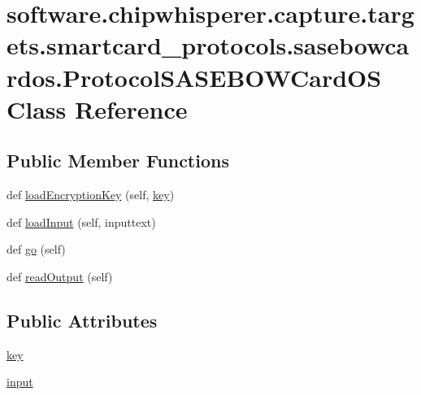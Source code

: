 \hypertarget{classsoftware_1_1chipwhisperer_1_1capture_1_1targets_1_1smartcard__protocols_1_1sasebowcardos_1_1ProtocolSASEBOWCardOS}{}\section{software.\+chipwhisperer.\+capture.\+targets.\+smartcard\+\_\+protocols.\+sasebowcardos.\+Protocol\+S\+A\+S\+E\+B\+O\+W\+Card\+O\+S Class Reference}
\label{classsoftware_1_1chipwhisperer_1_1capture_1_1targets_1_1smartcard__protocols_1_1sasebowcardos_1_1ProtocolSASEBOWCardOS}
\subsection*{Public Member Functions}
\begin{DoxyCompactItemize}
\item 
def \hyperlink{classsoftware_1_1chipwhisperer_1_1capture_1_1targets_1_1smartcard__protocols_1_1sasebowcardos_1_1ProtocolSASEBOWCardOS_a684817de795ab9621c3a09b377d84087}{load\+Encryption\+Key} (self, \hyperlink{classsoftware_1_1chipwhisperer_1_1capture_1_1targets_1_1smartcard__protocols_1_1sasebowcardos_1_1ProtocolSASEBOWCardOS_aeaa46d1304eb946ffc58d20c75c0031f}{key})
\item 
def \hyperlink{classsoftware_1_1chipwhisperer_1_1capture_1_1targets_1_1smartcard__protocols_1_1sasebowcardos_1_1ProtocolSASEBOWCardOS_a8f1b2caf21431dcd3aad9f37d6afb5a6}{load\+Input} (self, inputtext)
\item 
def \hyperlink{classsoftware_1_1chipwhisperer_1_1capture_1_1targets_1_1smartcard__protocols_1_1sasebowcardos_1_1ProtocolSASEBOWCardOS_aa69733b4941080bb31bb4072d37ed2d5}{go} (self)
\item 
def \hyperlink{classsoftware_1_1chipwhisperer_1_1capture_1_1targets_1_1smartcard__protocols_1_1sasebowcardos_1_1ProtocolSASEBOWCardOS_a7605a092891bd7a97304e7cf63e417bd}{read\+Output} (self)
\end{DoxyCompactItemize}
\subsection*{Public Attributes}
\begin{DoxyCompactItemize}
\item 
\hyperlink{classsoftware_1_1chipwhisperer_1_1capture_1_1targets_1_1smartcard__protocols_1_1sasebowcardos_1_1ProtocolSASEBOWCardOS_aeaa46d1304eb946ffc58d20c75c0031f}{key}
\item 
\hyperlink{classsoftware_1_1chipwhisperer_1_1capture_1_1targets_1_1smartcard__protocols_1_1sasebowcardos_1_1ProtocolSASEBOWCardOS_a08cd821d133142d7d4938bd83fb7b646}{input}
\end{DoxyCompactItemize}


